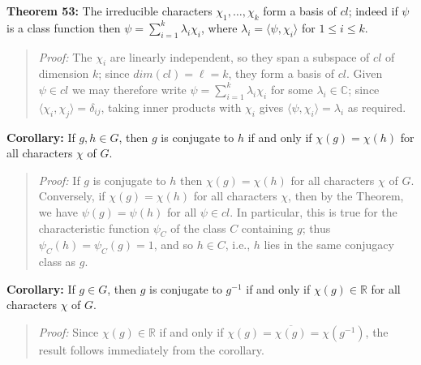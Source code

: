 {{\bf Theorem 53:} The irreducible characters
$\chi_1,\dots,\chi_k$ form a basis of $ cl$; indeed if
$\psi$ is a class function then $\psi=\sum_{i=1}^k\lambda_i\chi_i$, where
$\lambda_i=\langle\psi,\chi_i\rangle$ for $1\leq i\leq k$.
\begin{quote}
\emph{Proof:}
The $\chi_i$ are linearly independent, so they
span a subspace of $ cl$ of dimension $k$; since $dim(cl) = \ell =k$,
they form a basis of $ cl$. Given $\psi\in cl$ we may therefore write
$\psi=\sum_{i=1}^k\lambda_i\chi_i$ for some $\lambda_i\in{\mathbb C}$; since
$\langle\chi_i,\chi_j\rangle=\delta_{ij}$, taking inner products with
$\chi_i$ gives $\langle\psi,\chi_i\rangle=\lambda_i$ as required.
\end{quote}
{\bf Corollary:} If $g,h\in G$, then $g$ is conjugate
to $h$ if and only if $\chi(g)=\chi(h)$ for all characters $\chi$ of $G$.
\begin{quote}
\emph{Proof:}
If $g$ is conjugate to $h$ then $\chi(g)=\chi(h)$ for
all characters $\chi$ of $G$. Conversely, if $\chi(g)=\chi(h)$ for all
characters $\chi$, then by the Theorem, we have $\psi(g)=\psi(h)$ for all
$\psi\in cl$. In particular, this is true for the characteristic function
$\psi_C$ of the class $C$ containing $g$; thus $\psi_C(h)=\psi_C(g)=1$, and so
$h\in C$, i.e., $h$ lies in the same conjugacy class as $g$.
\end{quote}
{\bf Corollary:} If $g\in G$, then $g$ is conjugate to
$g^{-1}$ if and only if $\chi(g)\in {\mathbb R}$ for all characters $\chi$ of $G$.
\begin{quote}
\emph{Proof:}
Since $\chi(g)\in {\mathbb R}$ if and only if
$\chi(g)=\overline{\chi(g)}=\chi(g^{-1})$, the
result follows immediately from the corollary.
\end{quote}
}
